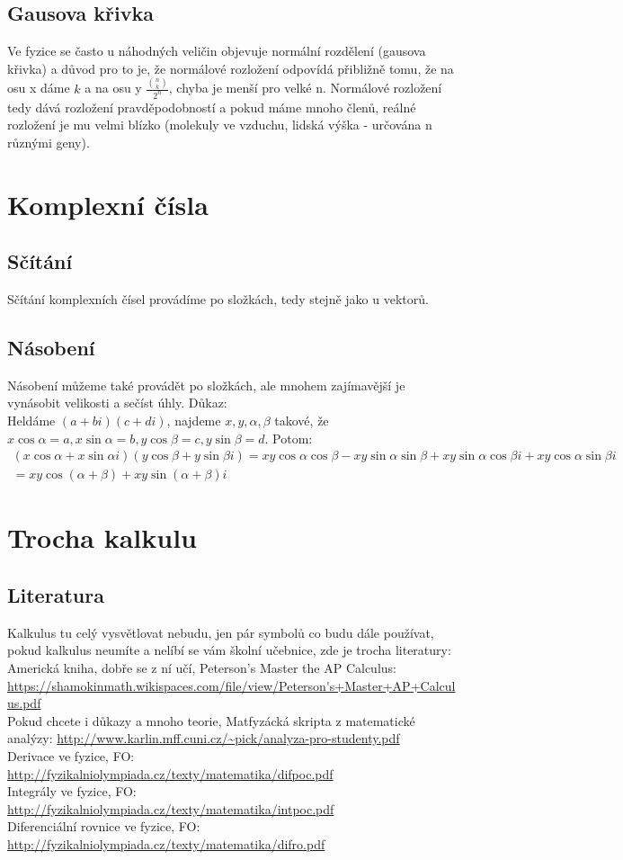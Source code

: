 \documentclass[titlepage]{report}
\begin{document}
\subsection{Gausova křivka}
Ve fyzice se často u náhodných veličin objevuje normální rozdělení (gausova křivka) a důvod pro to je, že normálové rozložení odpovídá přibližně tomu, že na osu x dáme $k$ a na osu y $\frac{\binom{n}{k}}{2^n}$, chyba je menší pro velké n. Normálové rozložení tedy dává rozložení pravděpodobností a pokud máme mnoho členů, reálné rozložení je mu velmi blízko (molekuly ve vzduchu, lidská výška - určována n různými geny).
\section{Komplexní čísla}
\subsection{Sčítání}
Sčítání komplexních čísel provádíme po složkách, tedy stejně jako u vektorů.
\subsection{Násobení}
Násobení můžeme také provádět po složkách, ale mnohem zajímavější je vynásobit velikosti a sečíst úhly. Důkaz:\\
Heldáme $(a + bi)(c + di)$, najdeme $x,y,\alpha, \beta$ takové, že $x \cos\alpha = a, x \sin\alpha = b, y \cos\beta = c, y \sin\beta = d$. Potom:
\begin{multline}
(x \cos\alpha + x \sin\alpha i)(y \cos\beta + y \sin\beta i) = xy\cos\alpha\cos\beta - xy\sin\alpha\sin\beta + xy\sin\alpha\cos\beta i + xy\cos\alpha\sin\beta i \\
= xy\cos(\alpha + \beta) + xy\sin(\alpha + \beta) i
\end{multline}
\section{Trocha kalkulu}
\subsection{Literatura}
Kalkulus tu celý vysvětlovat nebudu, jen pár symbolů co budu dále používat, pokud kalkulus neumíte a nelíbí se vám školní učebnice, zde je trocha literatury:\\
Americká kniha, dobře se z ní učí, Peterson's Master the AP Calculus: \url{https://shamokinmath.wikispaces.com/file/view/Peterson's+Master+AP+Calculus.pdf}\\
Pokud chcete i důkazy a mnoho teorie, Matfyzácká skripta z matematické analýzy: \url{http://www.karlin.mff.cuni.cz/~pick/analyza-pro-studenty.pdf}\\
Derivace ve fyzice, FO: \url{http://fyzikalniolympiada.cz/texty/matematika/difpoc.pdf}\\
Integrály ve fyzice, FO: \url{http://fyzikalniolympiada.cz/texty/matematika/intpoc.pdf}\\
Diferenciální rovnice ve fyzice, FO: \url{http://fyzikalniolympiada.cz/texty/matematika/difro.pdf}
\end{document}
